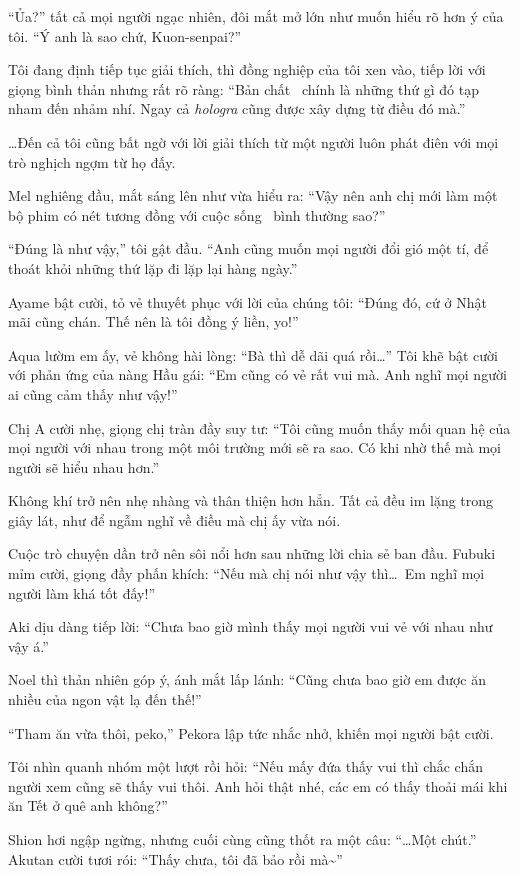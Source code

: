 \documentclass[../main.tex]{subfiles}
\begin{document}
``Ủa?'' tất cả mọi người ngạc nhiên, đôi mắt mở lớn như muốn hiểu rõ hơn ý của tôi. ``Ý anh là sao chứ, Kuon-senpai?''

Tôi đang định tiếp tục giải thích, thì đồng nghiệp của tôi xen vào, tiếp lời với giọng bình thản nhưng rất rõ ràng: ``Bản chất \hll\ chính là những thứ gì đó tạp nham đến nhảm nhí. Ngay cả \textit{hologra} cũng được xây dựng từ điều đó mà.''

\dots Đến cả tôi cũng bất ngờ với lời giải thích từ một người luôn phát điên với mọi trò nghịch ngợm từ họ đấy.

Mel nghiêng đầu, mắt sáng lên như vừa hiểu ra: ``Vậy nên anh chị mới làm một bộ phim có nét tương đồng với cuộc sống \hll\ bình thường sao?''

``Đúng là như vậy,'' tôi gật đầu. ``Anh cũng muốn mọi người đổi gió một tí, để thoát khỏi những thứ lặp đi lặp lại hàng ngày.''

Ayame bật cười, tỏ vẻ thuyết phục với lời của chúng tôi: ``Đúng đó, cứ ở Nhật mãi cũng chán. Thế nên là tôi đồng ý liền, yo!''

Aqua lườm em ấy, vẻ không hài lòng: ``Bà thì dễ dãi quá rồi\dots'' Tôi khẽ bật cười với phản ứng của nàng Hầu gái: ``Em cũng có vẻ rất vui mà. Anh nghĩ mọi người ai cũng cảm thấy như vậy!''

Chị A cười nhẹ, giọng chị tràn đầy suy tư: ``Tôi cũng muốn thấy mối quan hệ của mọi người với nhau trong một môi trường mới sẽ ra sao. Có khi nhờ thế mà mọi người sẽ hiểu nhau hơn.''

Không khí trở nên nhẹ nhàng và thân thiện hơn hẳn. Tất cả đều im lặng trong giây lát, như để ngẫm nghĩ về điều mà chị ấy vừa nói.

Cuộc trò chuyện dần trở nên sôi nổi hơn sau những lời chia sẻ ban đầu. Fubuki mỉm cười, giọng đầy phấn khích: ``Nếu mà chị nói như vậy thì\dots\ Em nghĩ mọi người làm khá tốt đấy!''

Aki dịu dàng tiếp lời: ``Chưa bao giờ mình thấy mọi người vui vẻ với nhau như vậy á.''

Noel thì thản nhiên góp ý, ánh mắt lấp lánh: ``Cũng chưa bao giờ em được ăn nhiều của ngon vật lạ đến thế!''

``Tham ăn vừa thôi, peko,'' Pekora lập tức nhắc nhở, khiến mọi người bật cười.

Tôi nhìn quanh nhóm một lượt rồi hỏi: ``Nếu mấy đứa thấy vui thì chắc chắn người xem cũng sẽ thấy vui thôi. Anh hỏi thật nhé, các em có thấy thoải mái khi ăn Tết ở quê anh không?''

Shion hơi ngập ngừng, nhưng cuối cùng cũng thốt ra một câu: ``\dots Một chút.'' Akutan cười tươi rói: ``Thấy chưa, tôi đã bảo rồi mà\~{}''
\end{document}
